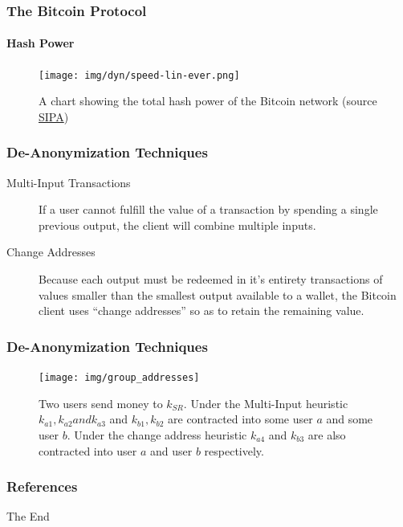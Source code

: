 \documentclass{beamer}
\begin{document}
\begin{frame}
\frametitle{The Bitcoin Protocol}
\framesubtitle{Hash Power}
\begin{figure}[h!]
    \centering
    \texttt{[image: img/dyn/speed-lin-ever.png]}
    \caption{A chart showing the total hash power of the Bitcoin network (source \href{http://bitcoin.sipa.be/speed-lin-ever.png}{SIPA})}
    \label{fig:blockchain}
\end{figure}
\end{frame}

\begin{frame}
\frametitle{De-Anonymization Techniques}
\begin{description}

\item[Multi-Input Transactions] If a user cannot fulfill the value of a transaction by spending a  single previous output, the client will combine multiple inputs\cite{reid-anon}.
\item[Change Addresses] Because each output must be redeemed in it's entirety transactions of values smaller than the smallest output available to a wallet, the Bitcoin client uses ``change addresses'' so as to retain the remaining value.

\end{description}
\end{frame}

\begin{frame}
\frametitle{De-Anonymization Techniques}
\begin{figure}[h!]
    \centering
    \texttt{[image: img/group\_addresses]}
    \caption{Two users send money to $k_{SR}$. Under the Multi-Input  heuristic $k_{a1}, k_{a2} and k_{a3}$ and $k_{b1}, k_{b2}$ are contracted into  some user $a$ and some user $b$. Under the change address heuristic  $k_{a4}$ and $k_{b3}$ are also contracted into user $a$ and user $b$  respectively. }
    \label{fig:blockchain}
\end{figure}
\end{frame}



\begin{frame}
\frametitle{References}
\footnotesize{
\printbibliography
}
\end{frame}
 
\begin{frame}
\centerline{The End}
\end{frame}
\end{document}
